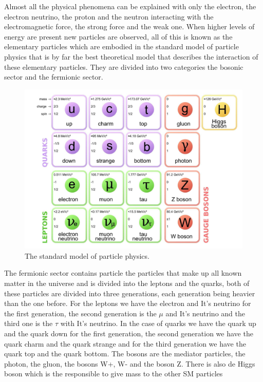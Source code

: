 Almost all the physical phenomena can be explained with only the electron, the electron neutrino, the proton and the neutron interacting with the electromagnetic force, the strong force and the weak one. When higher levels of energy are present new particles are observed, all of this is known as the elementary particles which are embodied in the standard model of particle physics that is by far the best theoretical model that describes the interaction of these elementary particles. They are divided into two categories the bosonic sector and the fermionic sector.  \cite{mppthomson}   


\begin{figure}[h]
    \centering
   \includegraphics[width=1\textwidth]{sm.png}
    \caption{The standard model of particle physics.\cite{pic2}}
    \label{fig:four-forces}
\end{figure}


The fermionic sector contains particle the particles that make up all known matter in the universe and is divided into the leptons and the quarks, both of these particles are divided into three generations, each generation being heavier than the one before. For the leptons we have the electron and It's neutrino for the first generation, the second generation is the $\mu$ and It's neutrino and the third one is the $\tau$ with It's neutrino. In the case of quarks we have the quark up and the quark down for the first generation, the second generation we have the quark charm and the quark strange and for the third generation we have the quark top and the quark bottom. The bosons are the mediator particles, the photon, the gluon, the bosons W+, W- and the boson Z. There is also de Higgs boson which is the responsible to give mass to the other SM particles  



